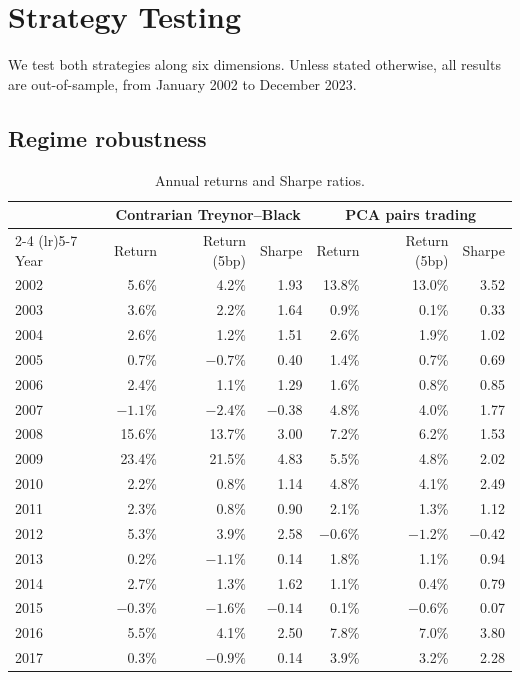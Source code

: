 \documentclass[12pt,letterpaper]{article}
\begin{document}
\section{Strategy Testing}

We test both strategies along six dimensions. Unless stated otherwise, all results are out-of-sample, from January 2002 to December 2023.

\subsection{Regime robustness}

\begin{table}[H]
\centering
\caption{Annual returns and Sharpe ratios.}
\label{tab:yearly}
\begin{tabular}{lrrrrrr}
\toprule
& \multicolumn{3}{c}{Contrarian Treynor--Black} & \multicolumn{3}{c}{PCA pairs trading} \\
\cmidrule(lr){2-4} \cmidrule(lr){5-7}
Year & Return & Return (5bp) & Sharpe & Return & Return (5bp) & Sharpe \\
\midrule
2002 & 5.6\% & 4.2\% & 1.93 & 13.8\% & 13.0\% & 3.52 \\
2003 & 3.6\% & 2.2\% & 1.64 & 0.9\% & 0.1\% & 0.33 \\
2004 & 2.6\% & 1.2\% & 1.51 & 2.6\% & 1.9\% & 1.02 \\
2005 & 0.7\% & $-0.7\%$ & 0.40 & 1.4\% & 0.7\% & 0.69 \\
2006 & 2.4\% & 1.1\% & 1.29 & 1.6\% & 0.8\% & 0.85 \\
2007 & $-1.1\%$ & $-2.4\%$ & $-0.38$ & 4.8\% & 4.0\% & 1.77 \\
2008 & 15.6\% & 13.7\% & 3.00 & 7.2\% & 6.2\% & 1.53 \\
2009 & 23.4\% & 21.5\% & 4.83 & 5.5\% & 4.8\% & 2.02 \\
2010 & 2.2\% & 0.8\% & 1.14 & 4.8\% & 4.1\% & 2.49 \\
2011 & 2.3\% & 0.8\% & 0.90 & 2.1\% & 1.3\% & 1.12 \\
2012 & 5.3\% & 3.9\% & 2.58 & $-0.6\%$ & $-1.2\%$ & $-0.42$ \\
2013 & 0.2\% & $-1.1\%$ & 0.14 & 1.8\% & 1.1\% & 0.94 \\
2014 & 2.7\% & 1.3\% & 1.62 & 1.1\% & 0.4\% & 0.79 \\
2015 & $-0.3\%$ & $-1.6\%$ & $-0.14$ & 0.1\% & $-0.6\%$ & 0.07 \\
2016 & 5.5\% & 4.1\% & 2.50 & 7.8\% & 7.0\% & 3.80 \\
2017 & 0.3\% & $-0.9\%$ & 0.14 & 3.9\% & 3.2\% & 2.28 \\

\end{tabular}
\end{table}
\end{document}
